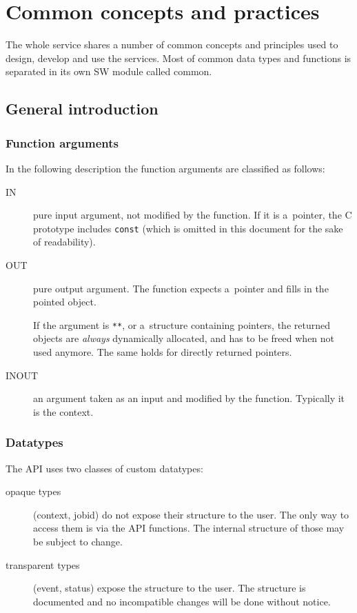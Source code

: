 
\section{Common concepts and practices}

The whole \LB service shares a number of common concepts and
principles used to design, develop and use the services. Most of
common data types and functions is separated in its own SW module called
\LB common.

\subsection{General introduction}

\subsubsection{Function arguments}
In the following description the function arguments are classified as follows:
\begin{description}
\item[IN] pure input argument, not modified by the function.
If it is a~pointer, the C prototype includes \verb'const' (which is omitted in
this document for the sake of readability).
\item[OUT] pure output argument. The function expects a~pointer and fills in
the pointed object.

If the argument is \verb'**', or a~structure containing pointers,
the returned objects are \emph{always} dynamically allocated,
and has to be freed when not used anymore.
The same holds for directly returned pointers.

\item[INOUT] an argument taken as an input and modified by the function.
Typically it is the \LB context.

\end{description}

\subsubsection{Datatypes}
The API uses two classes of custom datatypes:
\begin{description}
\item[opaque types] (\eg context, jobid) do not expose their structure
to the user.
The only way to access them is via the API functions.
The internal structure of those may be subject to change.

\item[transparent types] (\eg event, status) expose the structure to the
user. The structure is documented and no incompatible changes will be done
without notice.
\end{description}

